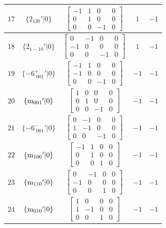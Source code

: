 \documentclass[fleqn,8pt]{jsarticle}
\begin{document}
\begin{longtable}{ccccc}
$ 17 $ & $ \{2{}_{120}{}'|0\} $ & $ \begin{bmatrix} -1 & 1 & 0 & 0 \\ 0 & 1 & 0 & 0 \\ 0 & 0 & -1 & 0 \end{bmatrix} $ & $ 1 $ & $ -1 $ \\ \hline
$ 18 $ & $ \{2{}_{1-10}{}'|0\} $ & $ \begin{bmatrix} 0 & -1 & 0 & 0 \\ -1 & 0 & 0 & 0 \\ 0 & 0 & -1 & 0 \end{bmatrix} $ & $ 1 $ & $ -1 $ \\ \hline
$ 19 $ & $ \{-6^{+}_{\,\,001}{}'|0\} $ & $ \begin{bmatrix} -1 & 1 & 0 & 0 \\ -1 & 0 & 0 & 0 \\ 0 & 0 & -1 & 0 \end{bmatrix} $ & $ -1 $ & $ -1 $ \\ \hline
$ 20 $ & $ \{{\rm m}_{001}{}'|0\} $ & $ \begin{bmatrix} 1 & 0 & 0 & 0 \\ 0 & 1 & 0 & 0 \\ 0 & 0 & -1 & 0 \end{bmatrix} $ & $ -1 $ & $ -1 $ \\ \hline
$ 21 $ & $ \{-6^{-}_{\,\,001}{}'|0\} $ & $ \begin{bmatrix} 0 & -1 & 0 & 0 \\ 1 & -1 & 0 & 0 \\ 0 & 0 & -1 & 0 \end{bmatrix} $ & $ -1 $ & $ -1 $ \\ \hline
$ 22 $ & $ \{{\rm m}_{100}{}'|0\} $ & $ \begin{bmatrix} -1 & 1 & 0 & 0 \\ 0 & 1 & 0 & 0 \\ 0 & 0 & 1 & 0 \end{bmatrix} $ & $ -1 $ & $ -1 $ \\ \hline
$ 23 $ & $ \{{\rm m}_{110}{}'|0\} $ & $ \begin{bmatrix} 0 & -1 & 0 & 0 \\ -1 & 0 & 0 & 0 \\ 0 & 0 & 1 & 0 \end{bmatrix} $ & $ -1 $ & $ -1 $ \\ \hline
$ 24 $ & $ \{{\rm m}_{010}{}'|0\} $ & $ \begin{bmatrix} 1 & 0 & 0 & 0 \\ 1 & -1 & 0 & 0 \\ 0 & 0 & 1 & 0 \end{bmatrix} $ & $ -1 $ & $ -1 $ \\
\end{longtable}
\end{document}
